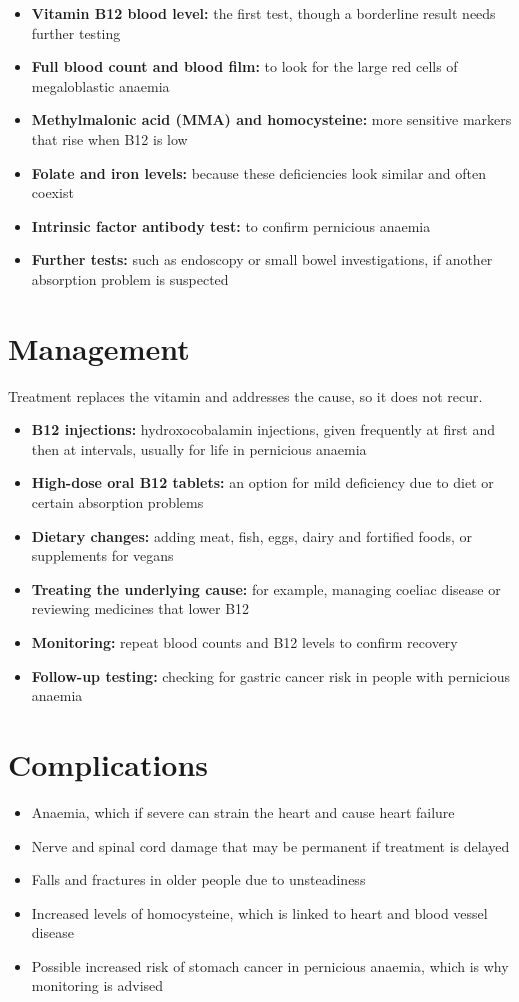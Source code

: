 \begin{itemize}
    \item \textbf{Vitamin B12 blood level:} the first test, though a borderline result needs further testing
    \item \textbf{Full blood count and blood film:} to look for the large red cells of megaloblastic anaemia
    \item \textbf{Methylmalonic acid (MMA) and homocysteine:} more sensitive markers that rise when B12 is low
    \item \textbf{Folate and iron levels:} because these deficiencies look similar and often coexist
    \item \textbf{Intrinsic factor antibody test:} to confirm pernicious anaemia
    \item \textbf{Further tests:} such as endoscopy or small bowel investigations, if another absorption problem is suspected
\end{itemize}

\section*{Management}
Treatment replaces the vitamin and addresses the cause, so it does not recur.

\begin{itemize}
    \item \textbf{B12 injections:} hydroxocobalamin injections, given frequently at first and then at intervals, usually for life in pernicious anaemia
    \item \textbf{High-dose oral B12 tablets:} an option for mild deficiency due to diet or certain absorption problems
    \item \textbf{Dietary changes:} adding meat, fish, eggs, dairy and fortified foods, or supplements for vegans
    \item \textbf{Treating the underlying cause:} for example, managing coeliac disease or reviewing medicines that lower B12
    \item \textbf{Monitoring:} repeat blood counts and B12 levels to confirm recovery
    \item \textbf{Follow-up testing:} checking for gastric cancer risk in people with pernicious anaemia
\end{itemize}

\section*{Complications}
\begin{itemize}
    \item Anaemia, which if severe can strain the heart and cause heart failure
    \item Nerve and spinal cord damage that may be permanent if treatment is delayed
    \item Falls and fractures in older people due to unsteadiness
    \item Increased levels of homocysteine, which is linked to heart and blood vessel disease
    \item Possible increased risk of stomach cancer in pernicious anaemia, which is why monitoring is advised
\end{itemize}


